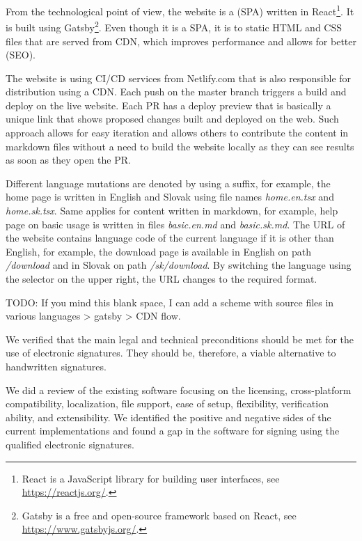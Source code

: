 \documentclass[thesismargins, english, thesislinespacing, onelinechapterstyle, upjsfrontpage]{rnthesis}
\begin{document}
From the technological point of view, the website is a  (SPA) written in React\footnote{React is a JavaScript library for building user interfaces, see \url{https://reactjs.org/}.}.
It is built using Gatsby\footnote{Gatsby is a free and open-source framework based on React, see \url{https://www.gatsbyjs.org/}.}.
Even though it is a SPA, it is  to static HTML and CSS files that are served from CDN, which improves performance and allows for better  (SEO).

The website is using CI/CD services from Netlify.com that is also responsible for distribution using a CDN.
Each push on the master branch triggers a build and deploy on the live website.
Each PR has a deploy preview that is basically a unique link that shows proposed changes built and deployed on the web.
Such approach allows for easy iteration and allows others to contribute the content in markdown files without a need to build the website locally as they can see results as soon as they open the PR.

Different language mutations are denoted by using a suffix, for example, the home page is written in English and Slovak using file names \textit{home.en.tsx} and \textit{home.sk.tsx}.
Same applies for content written in markdown, for example, help page on basic usage is written in files \textit{basic.en.md} and \textit{basic.sk.md}.
The URL of the website contains language code of the current language if it is other than English, for example, the download page is available in English on path \textit{/download} and in Slovak on path \textit{/sk/download}.
By switching the language using the selector on the upper right, the URL changes to the required format.

TODO: If you mind this blank space, I can add a scheme with source files in various languages > gatsby > CDN flow.

\zaver

We verified that the main legal and technical preconditions should be met for the use of electronic signatures.
They should be, therefore, a viable alternative to handwritten signatures.

We did a review of the existing software focusing on the licensing, cross-platform compatibility, localization, file support, ease of setup, flexibility, verification ability, and extensibility.
We identified the positive and negative sides of the current implementations and found a gap in the software for signing using the qualified electronic signatures.
\end{document}
